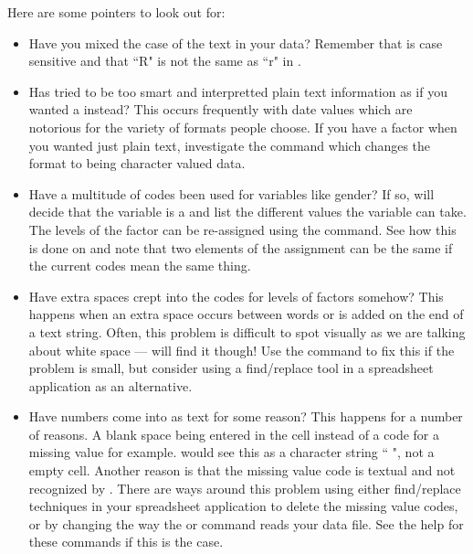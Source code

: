 Here are some pointers to look out for:\begin{itemize} 
 
\item Have you mixed the case of the text in your data? Remember that \R{} is case sensitive and that ``R" is not the same as ``r" in \R{}. 
 
\item Has \R{} tried to be too smart and interpretted plain text information as if you wanted a  instead? This occurs frequently with date values which are notorious for the variety of formats people choose. If you have a factor when you wanted just plain text, investigate the  command which changes the format to being character valued data. 
\item Have a multitude of codes been used for variables like gender? If so, \R{} will decide that the variable is a  and list the different values the variable can take. The levels of the factor can be re-assigned using the  command. See how this is done on \pageref{UseOfLevels} and note that two elements of the assignment can be the same if the current codes mean the same thing. 
\item Have extra spaces crept into the codes for levels of factors somehow? This happens when an extra space occurs between words or is added on the end of a text string. Often, this problem is difficult to spot visually as we are talking about white space --- \R{} will find it though! Use the  command to fix this if the problem is small, but consider using a find/replace tool in a spreadsheet application as an alternative. 
\item Have numbers come into \R{} as text for some reason? This happens for a number of reasons. A blank space being entered in the cell instead of a code for a missing value for example. \R{} would see this as a character string `` ", not a empty cell. Another reason is that the missing value code is textual and not recognized by \R{}. There are ways around this problem using either find/replace techniques in your spreadsheet application to delete the missing value codes, or by changing the way the  or  command reads your data file. See the help for these commands if this is the case. 
\end{itemize} 
 
 
 
 
 

